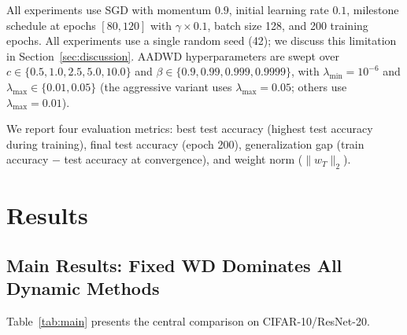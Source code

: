 \documentclass{article}
\begin{document}
All experiments use SGD with momentum $0.9$, initial learning rate $0.1$, milestone
schedule at epochs $[80, 120]$ with $\gamma \times 0.1$, batch size 128, and 200
training epochs.
All experiments use a single random seed (42); we discuss this limitation in
Section~\ref{sec:discussion}.
AADWD hyperparameters are swept over $c \in \{0.5, 1.0, 2.5, 5.0, 10.0\}$ and
$\beta \in \{0.9, 0.99, 0.999, 0.9999\}$, with $\lambda_{\min} = 10^{-6}$ and
$\lambda_{\max} \in \{0.01, 0.05\}$ (the aggressive variant uses
$\lambda_{\max} = 0.05$; others use $\lambda_{\max} = 0.01$).

We report four evaluation metrics: best test accuracy (highest test accuracy during
training), final test accuracy (epoch 200), generalization gap (train accuracy $-$
test accuracy at convergence), and weight norm ($\|w_T\|_2$).

\section{Results}
\label{sec:results}

\subsection{Main Results: Fixed WD Dominates All Dynamic Methods}
\label{sec:main_results}

Table~\ref{tab:main} presents the central comparison on CIFAR-10/ResNet-20.
\end{document}
